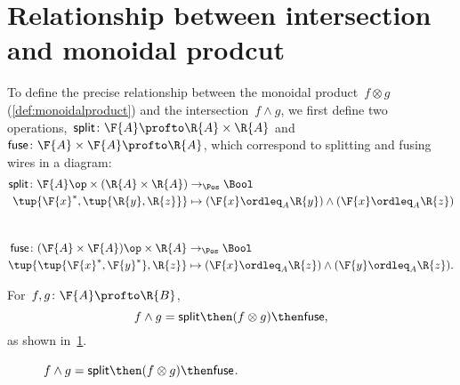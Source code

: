 \section{Relationship between intersection and monoidal prodcut}
To define the precise relationship between the monoidal product~$f \otimes g$ (\cref{def:monoidalproduct}) and the intersection~$f \wedge g$, we first define two operations,~$\mathsf{split} \colon \F{A} \profto \R{A} \times \R{A}$ and~$\mathsf{fuse} \colon \F{A} \times \F{A} \profto \R{A}$, which correspond to splitting and fusing wires in a diagram:
\begin{equation}
    \begin{aligned}
        \mathsf{split} \colon \F{A}\op \times (\R{A} \times \R{A}) & \to_\Pos \Bool                                                 \\
        \tup{\F{x}^*, \tup{\R{y}, \R{z}}}                          & \mapsto (\F{x} \ordleq_A \R{y}) \wedge (\F{x} \ordleq_A \R{z})
    \end{aligned}
\end{equation}
~
\begin{equation}
    \begin{aligned}
        \mathsf{fuse} \colon (\F{A} \times \F{A})\op \times \R{A} & \to_\Pos \Bool                                                  \\
        \tup{ \tup{\F{x}^*, \F{y}^*}, \R{z}}                      & \mapsto (\F{x} \ordleq_A \R{z}) \wedge (\F{y} \ordleq_A \R{z}).
    \end{aligned}
\end{equation}

\begin{lemma}
    \label{lem:intersection_split}
    For~$f,g \colon \F{A} \profto \R{B}$,
    \begin{equation}
        f \wedge g = \mathsf{split} \then (f \otimes g) \then \mathsf{fuse},
    \end{equation}
    as shown in~\cref{fig:lemmasplitfuse}.
    \begin{figure}[h!]
        \begin{center}
        \end{center}
        \caption{$f \wedge g = \mathsf{split} \then (f \otimes g) \then \mathsf{fuse}$. }
        \label{fig:lemmasplitfuse}
    \end{figure}
\end{lemma}

